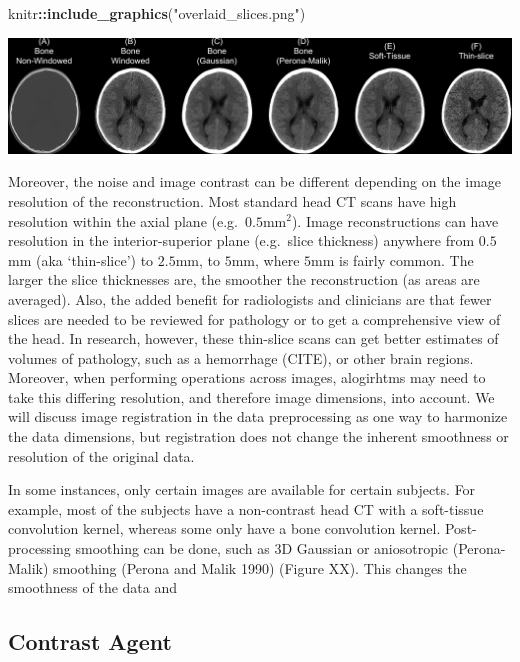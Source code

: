 \documentclass[]{elsarticle} %
\newenvironment{Shaded}{\begin{snugshade}}{\end{snugshade}}
\newcommand{\KeywordTok}[1]{\textcolor[rgb]{0.13,0.29,0.53}{\textbf{#1}}}
\newcommand{\NormalTok}[1]{#1}
\newcommand{\OperatorTok}[1]{\textcolor[rgb]{0.81,0.36,0.00}{\textbf{#1}}}
\newcommand{\StringTok}[1]{\textcolor[rgb]{0.31,0.60,0.02}{#1}}
\begin{document}
\begin{Shaded}
\begin{Highlighting}[]
\NormalTok{knitr}\OperatorTok{::}\KeywordTok{include_graphics}\NormalTok{(}\StringTok{"overlaid_slices.png"}\NormalTok{)}
\end{Highlighting}
\end{Shaded}

\includegraphics[width=1\linewidth]{overlaid_slices}

Moreover, the noise and image contrast can be different depending on the
image resolution of the reconstruction. Most standard head CT scans have
high resolution within the axial plane (e.g.~\(0.5\)mm\(^2\)). Image
reconstructions can have resolution in the interior-superior plane
(e.g.~slice thickness) anywhere from \(0.5\)mm (aka `thin-slice') to
\(2.5\)mm, to \(5\)mm, where \(5\)mm is fairly common. The larger the
slice thicknesses are, the smoother the reconstruction (as areas are
averaged). Also, the added benefit for radiologists and clinicians are
that fewer slices are needed to be reviewed for pathology or to get a
comprehensive view of the head. In research, however, these thin-slice
scans can get better estimates of volumes of pathology, such as a
hemorrhage (CITE), or other brain regions. Moreover, when performing
operations across images, alogirhtms may need to take this differing
resolution, and therefore image dimensions, into account. We will
discuss image registration in the data preprocessing as one way to
harmonize the data dimensions, but registration does not change the
inherent smoothness or resolution of the original data.

In some instances, only certain images are available for certain
subjects. For example, most of the subjects have a non-contrast head CT
with a soft-tissue convolution kernel, whereas some only have a bone
convolution kernel. Post-processing smoothing can be done, such as 3D
Gaussian or aniosotropic (Perona-Malik) smoothing (Perona and Malik
1990) (Figure XX). This changes the smoothness of the data and

\hypertarget{contrast-agent}{%
\subsection{Contrast Agent}\label{contrast-agent}}
\end{document}
